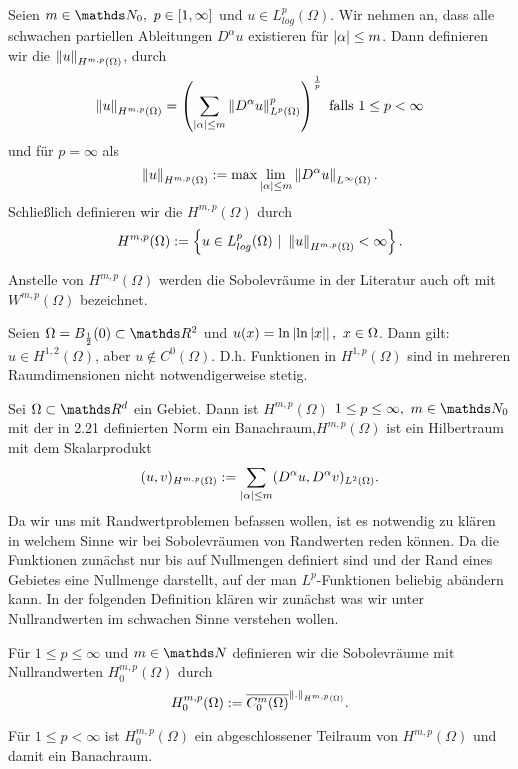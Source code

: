 Seien $m\in \N_0,~p\in [1,\infty]$ und $u\in L_{log}^p(\Omega)$.
Wir nehmen an, dass alle schwachen partiellen Ableitungen $D^\alpha u$ existieren für $\left\vert\alpha\right\vert \le m$.
Dann definieren wir die  $\left\Vert u\right\Vert_{H^{m,p}(\Omega)}$, durch
\[
\left\Vert u\right\Vert_{H^{m,p}(\Omega)} = \left( \sum_{\left\vert\alpha\right\vert\le m} \left\Vert D^\alpha u\right\Vert_{L^p(\Omega)}^p\right)^{\frac{1}{p}}\text{ falls } 1\le p< \infty
\]
und für $p=\infty$ als 
\[
\left\Vert u\right\Vert_{H^{m,p}(\Omega)} := \max\lim\limits_{\left\vert\alpha\right\vert\le m} \left\Vert D^\alpha u\right\Vert_{L^\infty (\Omega)}.
\]
Schließlich definieren wir die  $H^{m,p}(\Omega)$ durch
\[
H^{m,p}(\Omega) := \left\{u\in L_{log}^p(\Omega) ~|~ \left\Vert u\right\Vert_{H^{m,p}(\Omega)}< \infty\right\}.
\]

Anstelle von $H^{m,p}(\Omega)$ werden die Sobolevräume in der Literatur auch oft mit $W^{m,p}(\Omega)$ bezeichnet.

Seien $\Omega = B_{\frac{1}{2}}(0)\subset \R^2$ und $u(x) = \ln \left\vert\ln \left\vert x\right\vert\right\vert,~x\in \Omega$.
Dann gilt: $u\in H^{1,2}(\Omega)$, aber $u\notin C^0(\Omega)$.
D.h. Funktionen in $H^{1,p}(\Omega)$ sind in mehreren Raumdimensionen nicht notwendigerweise stetig.

Sei $\Omega\subset \R^d$ ein Gebiet.
Dann ist $H^{m,p}(\Omega)$ $1\le p\le \infty,~m\in \N_0$ mit der in 2.21 definierten Norm ein Banachraum,$H^{m,p}(\Omega)$ ist ein Hilbertraum mit dem Skalarprodukt
\[
(u,v)_{H^{m,p}(\Omega)} := \sum_{\left\vert\alpha\right\vert\le m} (D^\alpha u, D^\alpha v)_{L^2(\Omega)}.
\]
Da wir uns mit Randwertproblemen befassen wollen, ist es notwendig zu klären in welchem Sinne wir bei Sobolevräumen von Randwerten reden können.
Da die Funktionen zunächst nur bis auf Nullmengen definiert sind und der Rand eines Gebietes eine Nullmenge darstellt, auf der man $L^p$-Funktionen beliebig abändern kann.
In der folgenden Definition klären wir zunächst was wir unter Nullrandwerten im schwachen Sinne verstehen wollen.

Für $1\le p\le \infty$ und $m\in \N$ definieren wir die Sobolevräume mit Nullrandwerten $H_0^{m,p}(\Omega)$ durch
\[
H_0^{m,p}(\Omega) := \overline{C_0^m(\Omega)}^{\left\Vert.\right\Vert_{H^{m,p}(\Omega)}}.
\]

Für $1\le p<\infty$ ist $H_0^{m,p}(\Omega)$ ein abgeschlossener Teilraum von $H^{m,p}(\Omega)$ und damit ein Banachraum.\\

